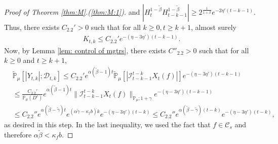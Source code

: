 \documentclass[12pt,a4paper]{amsart}
\theoremstyle{plain}
\theoremstyle{definition}
\numberwithin{equation}{section}
\begin{document}
\begin{proof}[Proof of Theorem \ref{thm:M}.(\ref{thm:M:1})]
  and $ |H_t^{1 - \tilde \beta} H_{t-k-1}^{ 1 - \tilde \beta}| \geq 2^{\frac{1}{1+\beta}} e^{-2\eta'(t-k-1)}$.
  Thus, there exists $C_{2.2}'> 0$ such that for all $k \geq 0, t\geq k+1$, almost surely
  \begin{align}
    K_{t,k}
    \leq C_{2.2}' e^{-(\eta - 3\eta')(t-k-1)}.
  \end{align}
  Now, by Lemma \ref{lem: control of mgtrs}, there exists $C''_{2.2}>0$ such that for all $k\geq 0$ and $t\geq k+1$,
  \begin{align}
    \label{eq: Y in D}
    & \mathbb{\widetilde{P}}_{\mu} [|Y_{t,k}| ; \mathcal{D}_{t,k} ]
    \leq C_{2.2}' e^{\alpha (\tilde \beta - 1)t} \mathbb{\widetilde{P}}_{\mu} [ | \mathcal{I}_{t-k-1}^{t-k}X_t(f)| ] e^{-(\eta - 3\eta')(t-k-1)} \\
    & \leq \frac{C_{2.2}' } {\mathbb{P}_{\mu}(D^c)} e^{ \alpha (\tilde \beta - 1)t} \|\mathcal{I}_{t-k-1}^{t-k} X_t(f)\|_{\mathbb P_\mu; 1+\gamma} e^{-(\eta - 3\eta')(t-k - 1)} \\
    & \leq C_{2.2}'' e^{\alpha(\tilde \beta - \tilde \gamma)t} e^{ (\alpha \tilde \gamma - \kappa_f b)k} e^{-(\eta - 3\eta')(t-k)}
     \leq C_{2.2}'' e^{\alpha(\tilde \beta - \tilde \gamma)(t-k)} e^{-(\eta - 3\eta')(t-k)},
  \end{align}
  as desired in this step.
  In the last inequality, we used the fact that $f\in \mathcal C_s$ and therefore $\alpha \tilde \beta < \kappa_f b$.


\end{proof}
\end{document}
